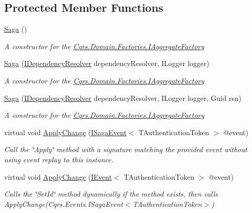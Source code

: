 \subsection*{Protected Member Functions}
\begin{DoxyCompactItemize}
\item 
\hyperlink{classCqrs_1_1Domain_1_1Saga_a1b6019cecbbf2572b64dd456cb5d91a2_a1b6019cecbbf2572b64dd456cb5d91a2}{Saga} ()
\begin{DoxyCompactList}\small\item\em A constructor for the \hyperlink{interfaceCqrs_1_1Domain_1_1Factories_1_1IAggregateFactory}{Cqrs.\+Domain.\+Factories.\+I\+Aggregate\+Factory} \end{DoxyCompactList}\item 
\hyperlink{classCqrs_1_1Domain_1_1Saga_affa39972d1946ab9f5d2474b17acbdd4_affa39972d1946ab9f5d2474b17acbdd4}{Saga} (\hyperlink{interfaceCqrs_1_1Configuration_1_1IDependencyResolver}{I\+Dependency\+Resolver} dependency\+Resolver, I\+Logger logger)
\begin{DoxyCompactList}\small\item\em A constructor for the \hyperlink{interfaceCqrs_1_1Domain_1_1Factories_1_1IAggregateFactory}{Cqrs.\+Domain.\+Factories.\+I\+Aggregate\+Factory} \end{DoxyCompactList}\item 
\hyperlink{classCqrs_1_1Domain_1_1Saga_acba7142c5e3ad568a60dc365fb7e8733_acba7142c5e3ad568a60dc365fb7e8733}{Saga} (\hyperlink{interfaceCqrs_1_1Configuration_1_1IDependencyResolver}{I\+Dependency\+Resolver} dependency\+Resolver, I\+Logger logger, Guid rsn)
\begin{DoxyCompactList}\small\item\em A constructor for the \hyperlink{interfaceCqrs_1_1Domain_1_1Factories_1_1IAggregateFactory}{Cqrs.\+Domain.\+Factories.\+I\+Aggregate\+Factory} \end{DoxyCompactList}\item 
virtual void \hyperlink{classCqrs_1_1Domain_1_1Saga_af8a1eddbadc8fc3fb69f18691f3b08ac_af8a1eddbadc8fc3fb69f18691f3b08ac}{Apply\+Change} (\hyperlink{interfaceCqrs_1_1Events_1_1ISagaEvent}{I\+Saga\+Event}$<$ T\+Authentication\+Token $>$ @event)
\begin{DoxyCompactList}\small\item\em Call the \char`\"{}\+Apply\char`\"{} method with a signature matching the provided {\itshape event}  without using event replay to this instance. \end{DoxyCompactList}\item 
virtual void \hyperlink{classCqrs_1_1Domain_1_1Saga_a25462563492d834e297388e0648a57ac_a25462563492d834e297388e0648a57ac}{Apply\+Change} (\hyperlink{interfaceCqrs_1_1Events_1_1IEvent}{I\+Event}$<$ T\+Authentication\+Token $>$ @event)
\begin{DoxyCompactList}\small\item\em Calls the \char`\"{}\+Set\+Id\char`\"{} method dynamically if the method exists, then calls Apply\+Change(\+Cqrs.\+Events.\+I\+Saga\+Event$<$\+T\+Authentication\+Token$>$) \end{DoxyCompactList}\end{DoxyCompactItemize}
